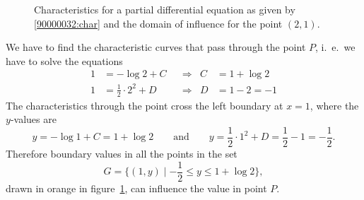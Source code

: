 \begin{loesung}
\begin{figure}[h]
\caption{Characteristics for a partial differential equation
as given by \eqref{90000032:char}
and the domain of influence for the point $(2,1)$.
\label{90000032:fig}}
\end{figure}
We have to find the characteristic curves that pass through the point
$P$, i.~e.~we have to solve the equations
\begin{align*}
1 &= -\log 2 + C           &&\Rightarrow& C &= 1+\log 2 \\
1 &= \frac12\cdot  2^2 + D &&\Rightarrow& D &= 1-2=-1
\end{align*}
The characteristics through the point cross
the left boundary at $x=1$, where the $y$-values are
\[
y
=
-\log1 + C
=
1+\log 2
\qquad\text{and}\qquad
y
=
\frac12\cdot 1^2 + D
=
\frac12-1
=
-\frac12.
\]
Therefore boundary values in all the points in the set
\[
G
=
\bigl\{ (1,y)\mid -{\textstyle\frac12} \le y \le 1+\log 2 \bigr\},
\]
drawn in orange in figure~\ref{90000032:fig}, can influence the
value in point $P$.
\end{loesung}
